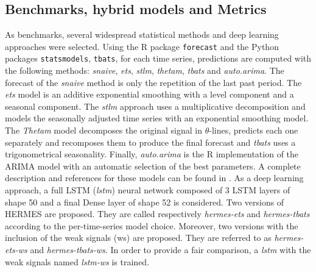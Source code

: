 \documentclass[lettersize,journal]{IEEEtran}
\begin{document}
\subsection{Benchmarks, hybrid models and Metrics}

As benchmarks, several widespread statistical methods and deep learning approaches were selected. Using the R package \texttt{forecast} and the Python packages \texttt{statsmodels},  \texttt{tbats}, for each time series, predictions are computed with the following methods: \textit{snaive}, \textit{ets}, \textit{stlm}, \textit{thetam}, \textit{tbats} and \textit{auto.arima}. The forecast of the \textit{snaive} method is only the repetition of the last past period. The \textit{ets} model is an additive exponential smoothing with a level component and a seasonal component. The \textit{stlm} approach uses a multiplicative decomposition and models the seasonally adjusted time series with an exponential smoothing model. The \textit{Thetam} model decomposes the original signal in $\theta$-lines, predicts each one separately and recomposes them to produce the final forecast and \textit{tbats} uses a trigonometrical seasonality. Finally, \textit{auto.arima} is the R implementation of the ARIMA model with an automatic selection of the best parameters. A complete description and references for these models can be found in \cite{hyndman2020package}. As a deep learning approach, a full LSTM (\textit{lstm}) neural network composed of 3 LSTM layers of shape 50 and a final Dense layer of shape 52 is considered.
Two versions of HERMES are proposed. They are called respectively \textit{hermes-ets} and \textit{hermes-tbats} according to the per-time-series model choice. Moreover, two versions with the inclusion of the weak signals (ws) are proposed. They are referred to as \textit{hermes-ets-ws} and \textit{hermes-tbats-ws}. In order to provide a fair comparison, a \textit{lstm} with the weak signals named \textit{lstm-ws} is trained.
\end{document}
